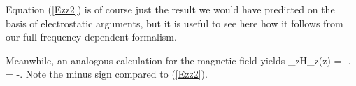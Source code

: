 Equation (\ref{Ezz2}) is of course just the result we 
would have predicted on the basis of electrostatic 
arguments, but it is useful to see here how it follows 
from our full frequency-dependent formalism.

Meanwhile, an analogous calculation for the magnetic field yields
{\lim_{z}H_z(z) 
   = -.
   = -.
}
Note the minus sign compared to (\ref{Ezz2}).

\newpage
